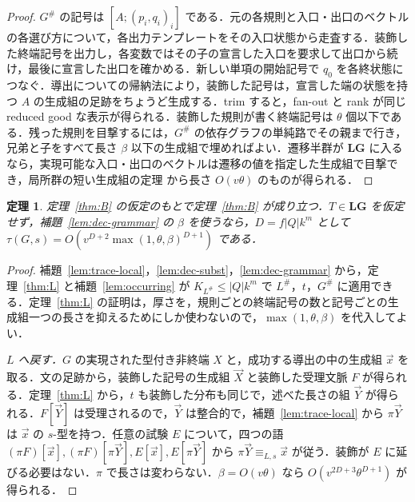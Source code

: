 \documentclass[11pt,a4paper]{ltjsarticle}
\numberwithin{equation}{section}
\theoremstyle{plain}
\newtheorem{theorem}{定理}[section]
\theoremstyle{definition}
\theoremstyle{remark}
\theoremstyle{plain}
\newcommand{\tuple}[1]{\vec{#1}}
\newcommand{\LG}{\mathbf{LG}}
\begin{document}
\begin{proof}
$G^\#$ の記号は $[A;(p_i,q_i)_i]$ である．元の各規則と入口・出口のベクトルの各選び方について，各出力テンプレートをその入口状態から走査する．装飾した終端記号を出力し，各変数ではその子の宣言した入口を要求して出口から続け，最後に宣言した出口を確かめる．新しい単項の開始記号で $q_0$ を各終状態につなぐ．導出についての帰納法により，装飾した記号は，宣言した端の状態を持つ $A$ の生成組の足跡をちょうど生成する．trim すると，fan-out と rank が同じ reduced good な表示が得られる．装飾した規則が書く終端記号は $\theta$ 個以下である．残った規則を目撃するには，$G^\#$ の依存グラフの単純路でその親まで行き，兄弟と子をすべて長さ $\beta$ 以下の生成組で埋めればよい．遷移半群が $\LG$ に入るなら，実現可能な入口・出口のベクトルは遷移の値を指定した生成組で目撃でき，局所群の短い生成組の定理 \cite[定理 \textit{local-group-polydata}]{KuriyamaCompendium} から長さ $O(v\theta)$ のものが得られる．
\end{proof}

\begin{theorem}
\label{thm:transfer}
定理~\ref{thm:B} の仮定のもとで定理~\ref{thm:B} が成り立つ．$T\in\LG$ を仮定せず，補題~\ref{lem:dec-grammar} の $\beta$ を使うなら，$D=f|Q|k^m$ として $\tau(G,s)=O(v^{D+2}\max(1,\theta,\beta)^{D+1})$ である．
\end{theorem}

\begin{proof}
補題~\ref{lem:trace-local}，\ref{lem:dec-subst}，\ref{lem:dec-grammar} から，定理~\ref{thm:L} と補題~\ref{lem:occurring} が $K_{L^\#}\le|Q|k^m$ で $L^\#$，$t$，$G^\#$ に適用できる．定理~\ref{thm:L} の証明は，厚さを，規則ごとの終端記号の数と記号ごとの生成組一つの長さを抑えるためにしか使わないので，$\max(1,\theta,\beta)$ を代入してよい．

\emph{$L$ へ戻す．}$G$ の実現された型付き非終端 $X$ と，成功する導出の中の生成組 $\tuple x$ を取る．文の足跡から，装飾した記号の生成組 $\tuple X$ と装飾した受理文脈 $F$ が得られる．定理~\ref{thm:L} から，$t$ も装飾した分布も同じで，述べた長さの組 $\tuple Y$ が得られる．$F[\tuple Y]$ は受理されるので，$\tuple Y$ は整合的で，補題~\ref{lem:trace-local} から $\pi\tuple Y$ は $\tuple x$ の $s$-型を持つ．任意の試験 $E$ について，四つの語 $(\pi F)[\tuple x],(\pi F)[\pi\tuple Y],E[\tuple x],E[\pi\tuple Y]$ から $\pi\tuple Y\equiv_{L,s}\tuple x$ が従う．装飾が $E$ に延びる必要はない．$\pi$ で長さは変わらない．$\beta=O(v\theta)$ なら $O(v^{2D+3}\theta^{D+1})$ が得られる．
\end{proof}
\end{document}
